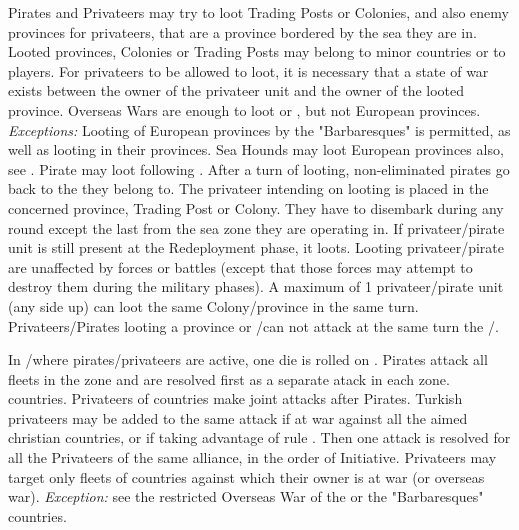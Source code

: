  Pirates and Privateers may try to
loot Trading Posts or Colonies, and also enemy provinces for privateers, that
are a province bordered by the sea they are in.
\bparag Looted provinces, Colonies or Trading Posts may belong to minor
countries or to players. For privateers to be allowed to loot, it is necessary
that a state of war exists between the owner of the privateer unit and the
owner of the looted province. Overseas Wars are enough to loot \TP or \COL,
but not European provinces.
\bparag \textit{Exceptions:} Looting of European provinces by the
"Barbaresques" is permitted, as well as looting in their provinces. Sea Hounds
may loot European provinces also, see .
\bparag Pirate may loot following . After a
turn of looting, non-eliminated pirates go back to the \STZ they belong to.
\bparag The privateer intending on looting is placed in the concerned
province, Trading Post or Colony. They have to disembark during any round
except the last from the sea zone they are operating in.
\bparag If privateer/pirate unit is still present at the Redeployment phase,
it loots. Looting privateer/pirate are unaffected by forces or battles (except
that those forces may attempt to destroy them during the military phases).
\bparag A maximum of 1 privateer/pirate unit (any side up) can loot the same
Colony/province in the same turn. Privateers/Pirates looting a province or
\COL/\TP can not attack at the same turn the \CTZ/\STZ.

 In \STZ/\CTZ where
pirates/privateers are active, one die is rolled on .
\bparag Pirates attack all fleets in the zone and are resolved first as a
separate atack in each zone.  countries.
\bparag Privateers of  countries make joint attacks after
Pirates.  Turkish privateers may be added to the same attack if at war against
all the aimed christian countries, or if taking advantage of rule
.
\bparag Then one attack is resolved for all the Privateers of the same
alliance, in the order of Initiative.  Privateers may target only fleets of
countries against which their owner is at war (or overseas
war). \emph{Exception:} see the restricted Overseas War of the
 or the "Barbaresques" countries.

